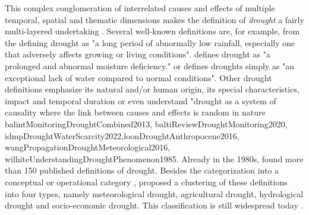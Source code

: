 This complex conglomeration of interrelated causes and effects of multiple temporal, spatial and thematic dimensions makes the definition of \textit{drought} a fairly multi-layered undertaking \autocite{balintMonitoringDroughtCombined2013}. Several well-known definitions are, for example, from the \autocite{theamericanheritagedictionaryoftheenglishlanguageDrought2022} defining drought as "a long period of abnormally low rainfall, especially one that adversely affects growing or living conditions". \autocite[2]{palmerMeteorologicalDrought1965} defines drought as "a prolonged and abnormal moisture deficiency." or \autocite{vanloonDroughtHumanmodifiedWorld2016} defines droughts simply as "an exceptional lack of water compared to normal conditions". Other drought definitions emphasize its natural and/or human origin, its special characteristics, impact and temporal duration or even understand "drought as a system of causality where the link between causes and effects is random in nature {balintMonitoringDroughtCombined2013, baltiReviewDroughtMonitoring2020, idmpDroughtWaterScarcity2022,loonDroughtAnthropocene2016, wangPropagationDroughtMeteorological2016, wilhiteUnderstandingDroughtPhenomenon1985}. Already in the 1980s, \autocite{wilhiteUnderstandingDroughtPhenomenon1985} found more than 150 published definitions of drought. Besides the categorization into a conceptual or operational category , \autocite{wilhiteUnderstandingDroughtPhenomenon1985} proposed a clustering of these definitions into four types, namely meteorological drought, agricultural drought, hydrological drought and socio-economic drought. This classification is still widespread today \autocite{balintMonitoringDroughtCombined2013, baltiReviewDroughtMonitoring2020, idmpDroughtWaterScarcity2022,vereintenationenSpecialReportDrought2021}.

